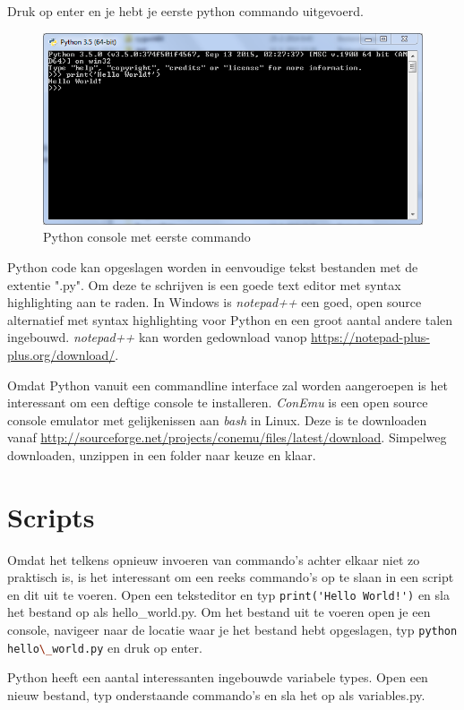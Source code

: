 \documentclass[11pt,twoside]{article}
\begin{document}
Druk op enter en je hebt je eerste python commando uitgevoerd.
\begin{figure}[ht]
	\centering
	\includegraphics[scale=0.5]{Python35_(64-bit)}
	\caption{Python console met eerste commando}
	\label{Python35_(64-bit)}
\end{figure}

Python code kan opgeslagen worden in eenvoudige tekst bestanden met de extentie "\textsf{.py}". Om deze te schrijven is een goede text editor met syntax highlighting aan te raden. In Windows is \emph{notepad++} een goed, open source alternatief met syntax highlighting voor Python en een groot aantal andere talen ingebouwd. \emph{notepad++} kan worden gedownload vanop \url{https://notepad-plus-plus.org/download/}.

Omdat Python vanuit een commandline interface zal worden aangeroepen is het interessant om een deftige console te installeren. \emph{ConEmu} is een open source console emulator met gelijkenissen aan \emph{bash} in Linux. Deze is te downloaden vanaf \url{http://sourceforge.net/projects/conemu/files/latest/download}. Simpelweg downloaden, unzippen in een folder naar keuze en klaar.

 	\section{Scripts}
Omdat het telkens opnieuw invoeren van commando's achter elkaar niet zo praktisch is, is het interessant om een reeks commando's op te slaan in een script en dit uit te voeren. Open een teksteditor en typ \lstinline{print('Hello World!')} en sla het bestand op als \textsf{hello\_world.py}. Om het bestand uit te voeren open je een console, navigeer naar de locatie waar je het bestand hebt opgeslagen, typ \lstinline[language=bash]{python hello\_world.py} en druk op enter.

Python heeft een aantal interessanten ingebouwde variabele types. Open een nieuw bestand, typ onderstaande commando's en sla het op als \textsf{variables.py}.

\end{document}
